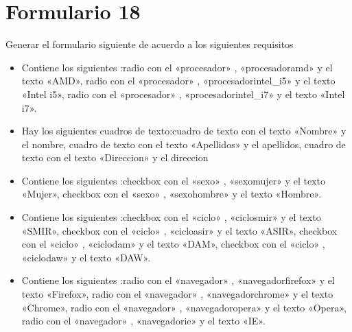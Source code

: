 \documentclass[letterpaper,10pt,spanish]{sphinxmanual}
\begin{document}
\section{Formulario 18}
\label{\detokenize{ejercicios/formularios/anexo_formularios:formulario-18}}
Generar el formulario siguiente de acuerdo a los siguientes requisitos
\begin{itemize}
\item {} 
Contiene los siguientes :radio con el   «procesador» ,   «procesadoramd»  y el texto «AMD», radio con el   «procesador» ,   «procesadorintel\_i5»  y el texto «Intel i5», radio con el   «procesador» ,   «procesadorintel\_i7»  y el texto «Intel i7».

\item {} 
Hay los siguientes cuadros de texto:cuadro de texto con el texto «Nombre» y el  nombre, cuadro de texto con el texto «Apellidos» y el  apellidos, cuadro de texto con el texto «Direccion» y el  direccion

\item {} 
Contiene los siguientes :checkbox con el   «sexo» ,   «sexomujer»  y el texto «Mujer», checkbox con el   «sexo» ,   «sexohombre»  y el texto «Hombre».

\item {} 
Contiene los siguientes :checkbox con el   «ciclo» ,   «ciclosmir»  y el texto «SMIR», checkbox con el   «ciclo» ,   «cicloasir»  y el texto «ASIR», checkbox con el   «ciclo» ,   «ciclodam»  y el texto «DAM», checkbox con el   «ciclo» ,   «ciclodaw»  y el texto «DAW».

\item {} 
Contiene los siguientes :radio con el   «navegador» ,   «navegadorfirefox»  y el texto «Firefox», radio con el   «navegador» ,   «navegadorchrome»  y el texto «Chrome», radio con el   «navegador» ,   «navegadoropera»  y el texto «Opera», radio con el   «navegador» ,   «navegadorie»  y el texto «IE».

\end{itemize}
\end{document}
